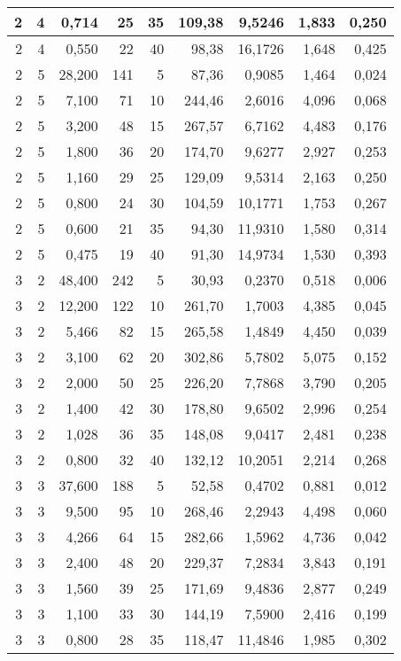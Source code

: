 \begin{tabular}{rrrrrrrrr}
2 & 4 & 0,714 & 25 & 35 & 109,38 & 9,5246 & 1,833 & 0,250 \\ \hline
2 & 4 & 0,550 & 22 & 40 & 98,38 & 16,1726 & 1,648 & 0,425 \\ \hline
2 & 5 & 28,200 & 141 & 5 & 87,36 & 0,9085 & 1,464 & 0,024 \\ \hline
2 & 5 & 7,100 & 71 & 10 & 244,46 & 2,6016 & 4,096 & 0,068 \\ \hline
2 & 5 & 3,200 & 48 & 15 & 267,57 & 6,7162 & 4,483 & 0,176 \\ \hline
2 & 5 & 1,800 & 36 & 20 & 174,70 & 9,6277 & 2,927 & 0,253 \\ \hline
2 & 5 & 1,160 & 29 & 25 & 129,09 & 9,5314 & 2,163 & 0,250 \\ \hline
2 & 5 & 0,800 & 24 & 30 & 104,59 & 10,1771 & 1,753 & 0,267 \\ \hline
2 & 5 & 0,600 & 21 & 35 & 94,30 & 11,9310 & 1,580 & 0,314 \\ \hline
2 & 5 & 0,475 & 19 & 40 & 91,30 & 14,9734 & 1,530 & 0,393 \\ \hline
3 & 2 & 48,400 & 242 & 5 & 30,93 & 0,2370 & 0,518 & 0,006 \\ \hline
3 & 2 & 12,200 & 122 & 10 & 261,70 & 1,7003 & 4,385 & 0,045 \\ \hline
3 & 2 & 5,466 & 82 & 15 & 265,58 & 1,4849 & 4,450 & 0,039 \\ \hline
3 & 2 & 3,100 & 62 & 20 & 302,86 & 5,7802 & 5,075 & 0,152 \\ \hline
3 & 2 & 2,000 & 50 & 25 & 226,20 & 7,7868 & 3,790 & 0,205 \\ \hline
3 & 2 & 1,400 & 42 & 30 & 178,80 & 9,6502 & 2,996 & 0,254 \\ \hline
3 & 2 & 1,028 & 36 & 35 & 148,08 & 9,0417 & 2,481 & 0,238 \\ \hline
3 & 2 & 0,800 & 32 & 40 & 132,12 & 10,2051 & 2,214 & 0,268 \\ \hline
3 & 3 & 37,600 & 188 & 5 & 52,58 & 0,4702 & 0,881 & 0,012 \\ \hline
3 & 3 & 9,500 & 95 & 10 & 268,46 & 2,2943 & 4,498 & 0,060 \\ \hline
3 & 3 & 4,266 & 64 & 15 & 282,66 & 1,5962 & 4,736 & 0,042 \\ \hline
3 & 3 & 2,400 & 48 & 20 & 229,37 & 7,2834 & 3,843 & 0,191 \\ \hline
3 & 3 & 1,560 & 39 & 25 & 171,69 & 9,4836 & 2,877 & 0,249 \\ \hline
3 & 3 & 1,100 & 33 & 30 & 144,19 & 7,5900 & 2,416 & 0,199 \\ \hline
3 & 3 & 0,800 & 28 & 35 & 118,47 & 11,4846 & 1,985 & 0,302 \\ \hline

\end{tabular}
